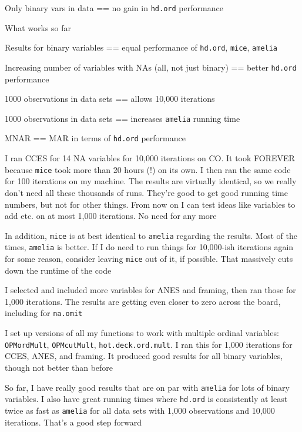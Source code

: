 \begin{coi}
\begin{coi}
				\item Only binary vars in data == no gain in \texttt{hd.ord} performance
			\end{coi}
		\item What works so far
			\begin{coi}
				\item Results for binary variables == equal performance of \texttt{hd.ord}, \texttt{mice}, \texttt{amelia}
				\item Increasing number of variables with NAs (all, not just binary) == better \texttt{hd.ord} performance
				\item 1000 observations in data sets == allows 10,000 iterations
				\item 1000 observations in data sets == increases \texttt{amelia} running time
				\item MNAR == MAR in terms of \texttt{hd.ord} performance
			\end{coi}
		\item I ran CCES for 14 NA variables for 10,000 iterations on CO. It took FOREVER because \texttt{mice} took more than 20 hours (!) on its own. I then ran the same code for 100 iterations on my machine. The results are virtually identical, so we really don't need all these thousands of runs. They're good to get good running time numbers, but not for other things. From now on I can test ideas like variables to add etc. on at most 1,000 iterations. No need for any more
		\item In addition, \texttt{mice} is at best identical to \texttt{amelia} regarding the results. Most of the times, \texttt{amelia} is better. If I do need to run things for 10,000-ish iterations again for some reason, consider leaving \texttt{mice} out of it, if possible. That massively cuts down the runtime of the code
		\item I selected and included more variables for ANES and framing, then ran those for 1,000 iterations. The results are getting even closer to zero across the board, including for \texttt{na.omit}
		\item I set up versions of all my functions to work with multiple ordinal variables: \texttt{OPMordMult}, \texttt{OPMcutMult}, \texttt{hot.deck.ord.mult}. I ran this for 1,000 iterations for CCES, ANES, and framing. It produced good results for all binary variables, though not better than before
		\item So far, I have really good results that are on par with \texttt{amelia} for lots of binary variables. I also have great running times where \texttt{hd.ord} is consistently at least twice as fast as \texttt{amelia} for all data sets with 1,000 observations and 10,000 iterations. That's a good step forward

\end{coi}
